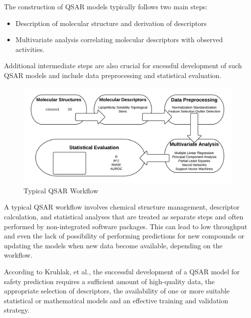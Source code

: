 The construction of QSAR models typically follows two main steps:
\begin{itemize}
\item Description of molecular structure and derivation of descriptors
\item Multivariate analysis correlating molecular descriptors with observed activities. 
\end{itemize}
Additional intermediate steps are also crucial for sucessful development of such QSAR models and include data preprocessing and statistical evaluation. \cite{Nantasenamat2009}

\begin{figure}[h,t]
  \caption{Typical QSAR Workflow}
  \centering
   \includegraphics[width=1\textwidth]{../img/Typical_QSAR_Process.png}
\end{figure}

A typical QSAR workflow involves chemical structure management, descriptor calculation, and statistical analyses that are treated as separate steps and often performed by non-integrated software packages. This can lead to low throughput and even the lack of possibility of performing predictions for new compounds or updating the models when new data become available, depending on the workflow.

According to Kruhlak, et al., the successful development of a QSAR model for safety prediction requires a sufficient amount of high-quality data, the appropriate selection of descriptors, the availability of one or more suitable statistical or mathematical models and an effective training and validation strategy.
\cite{Kruhlak2012}

